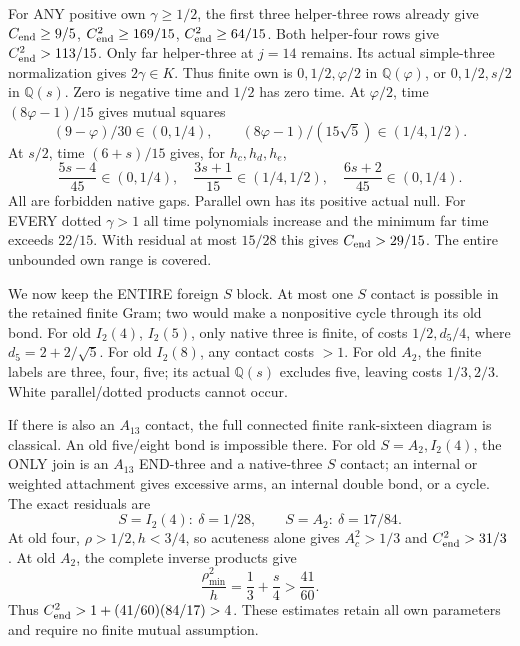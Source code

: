 \documentclass[11pt]{article}
\begin{document}
For ANY positive own \(\gamma\ge1/2\),
the first three helper-three rows already
give \(C_{\rm end}\ge9/5\),
\(C_{\rm end}^2\ge169/15\),
\(C_{\rm end}^2\ge64/15\).
Both helper-four rows give
\(C_{\rm end}^2>113/15\).
Only far helper-three at \(j=14\) remains.
Its actual simple-three normalization gives
\(2\gamma\in K\).
Thus finite own is
\(0,1/2,\varphi/2\) in \(\mathbb Q(\varphi)\),
or \(0,1/2,s/2\) in \(\mathbb Q(s)\).
Zero is negative time and \(1/2\) has zero
time.  At \(\varphi/2\), time
\((8\varphi-1)/15\) gives mutual squares
\[
        (9-\varphi)/30\in(0,1/4),\qquad
       (8\varphi-1)/(15\sqrt5)\in(1/4,1/2) .
\]
At \(s/2\), time \((6+s)/15\) gives,
for \(h_c,h_d,h_e\),
\[
 {\frac{5s-4}{45}}\in(0,1/4),\quad
 {\frac{3s+1}{15}}\in(1/4,1/2),\quad
 {\frac{6s+2}{45}}\in(0,1/4) .
\]
All are forbidden native gaps.
Parallel own has its positive actual null.
For EVERY dotted \(\gamma>1\) all time
polynomials increase and the minimum far
time exceeds \(22/15\).
With residual at most \(15/28\) this gives
\(C_{\rm end}>29/15\).
The entire unbounded own range is covered.

We now keep the ENTIRE foreign \(S\) block.
At most one \(S\) contact is possible in
the retained finite Gram; two would make
a nonpositive cycle through its old bond.
For old \(I_2(4)\), \(I_2(5)\), only native
three is finite, of costs \(1/2,d_5/4\),
where \(d_5=2+2/\sqrt5\).
For old \(I_2(8)\), any contact costs \(>1\).
For old \(A_2\), the finite labels are
three, four, five; its actual \(\mathbb Q(s)\)
excludes five, leaving costs \(1/3,2/3\).
White parallel/dotted products cannot occur.

If there is also an \(A_{13}\) contact,
the full connected finite rank-sixteen
diagram is classical.
An old five/eight bond is impossible there.
For old \(S=A_2,I_2(4)\), the ONLY join is
an \(A_{13}\) END-three and a native-three
\(S\) contact; an internal or weighted
attachment gives excessive arms, an internal
double bond, or a cycle.
The exact residuals are
\[
                    S=I_2(4):\ \delta=1/28,\qquad
                    S=A_2:\ \delta=17/84 .
\]
At old four, \(\rho>1/2,h<3/4\), so
acuteness alone gives \(A_c^2>1/3\) and
\(C_{\rm end}^2>31/3\).
At old \(A_2\), the complete inverse products
give
\[
                   {\frac{\rho_{\min}^2}{h}}
                       ={\frac{1}{3}}+{\frac{s}{4}}>{\frac{41}{60}}.
\]
Thus \(C_{\rm end}^2>1+(41/60)(84/17)>4\).
These estimates retain all own parameters
and require no finite mutual assumption.
\end{document}
